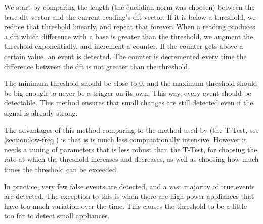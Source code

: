 We start by comparing the length (the euclidian norm was choosen) between the base \acrshort{dft} vector and the current reading's \acrshort{dft} vector. If it is below a threshold, we reduce that threshold linearly, and repeat that forever. When a reading produces a \acrshort{dft} which difference with a base is greater than the threshold, we augment the threshold exponentially, and increment a counter. If the counter gets above a certain value, an event is detected. The counter is decremented every time the difference between the \acrshort{dft} is not greater than the threshold.

The minimum threshold should be close to 0, and the maximum threshold should be big enough to never be a trigger on its own. This way, every event should be detectable. This method ensures that small changes are still detected even if the signal is already strong.

The advantages of this method comparing to the method used by \cite{bruneel2018energy} (the T-Test, see \autoref{section:low-freq}) is that is is much less computationally intensive. However it needs a tuning of parameters that is less robust than the T-Test, for choosing the rate at which the threshold increases and decreases, as well as choosing how much times the threshold can be exceeded.

In practice, very few false events are detected, and a vast majority of true events are detected. The exception to this is when there are high power appliances that have too much variation over the time. This causes the threshold to be a little too far to detect small appliances.

